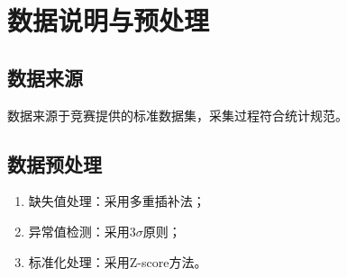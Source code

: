 \section{数据说明与预处理}


\subsection{数据来源}
数据来源于竞赛提供的标准数据集，采集过程符合统计规范。

\subsection{数据预处理}
\begin{enumerate}
    \item 缺失值处理：采用多重插补法；
    \item 异常值检测：采用$3\sigma$原则；
    \item 标准化处理：采用Z-score方法。
\end{enumerate}
